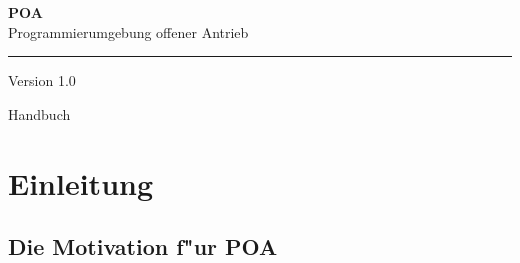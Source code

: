 \documentclass[a4paper,titlepage,12pt,ngerman]{scrbook}
\newcommand\version{Version 1.0 \xspace}
\begin{document}

\begin{titlepage}
\renewcommand{\thefootnote}{\fnsymbol{footnote}}
{\Huge
\raggedright
\textbf{POA} \\
\huge Programmierumgebung offener Antrieb
\rule{\textwidth}{0.75pt}
\par
}
\begin{flushleft}
\normalsize
\version
\end{flushleft}
\vfill

{\parindent=0cm
\Huge Handbuch
}


\setcounter{footnote}{0}
\end{titlepage}



\tableofcontents

\chapter{Einleitung}
\section{Die Motivation f"ur POA}
\end{document}
